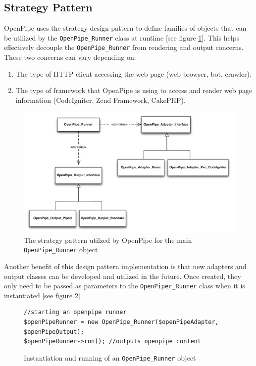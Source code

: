 \documentclass[12pt]{report}
\begin{document}
\subsection{Strategy Pattern}
OpenPipe uses the strategy design pattern to define families of objects that can be utilized by the \texttt{OpenPipe\_Runner} class at runtime [see figure \ref{fig:strategyRunner}]. This helps effectively decouple the \texttt{OpenPipe\_Runner} from rendering and output concerns. These two concerns can vary depending on:

\begin{enumerate}
	\item The type of HTTP client accessing the web page (web browser, bot, crawler).
	\item The type of framework that OpenPipe is using to access and render web page information (CodeIgniter, Zend Framework, CakePHP).
\end{enumerate}

\begin{figure}[H]
\centering
\includegraphics[width=\textwidth,keepaspectratio]{figures/images/strategy_runner.pdf}
\caption{The strategy pattern utilzed by OpenPipe for the main \texttt{OpenPipe\_Runner} object}
\label{fig:strategyRunner}
\end{figure}

Another benefit of this design pattern implementation is that new adapters and output classes can be developed and utilized in the future. Once created, they only need to be passed as parameters to the \texttt{OpenPiper\_Runner} class when it is instantiated [see figure \ref{fig:strategyRunnerCode}].

\begin{figure}[H]
\begin{lstlisting}
//starting an openpipe runner
$openPipeRunner = new OpenPipe_Runner($openPipeAdapter, $openPipeOutput); 
$openPipeRunner->run(); //outputs openpipe content
\end{lstlisting}
\caption{Instantiation and running of an \texttt{OpenPipe\_Runner} object}
\label{fig:strategyRunnerCode}
\end{figure}
\end{document}
